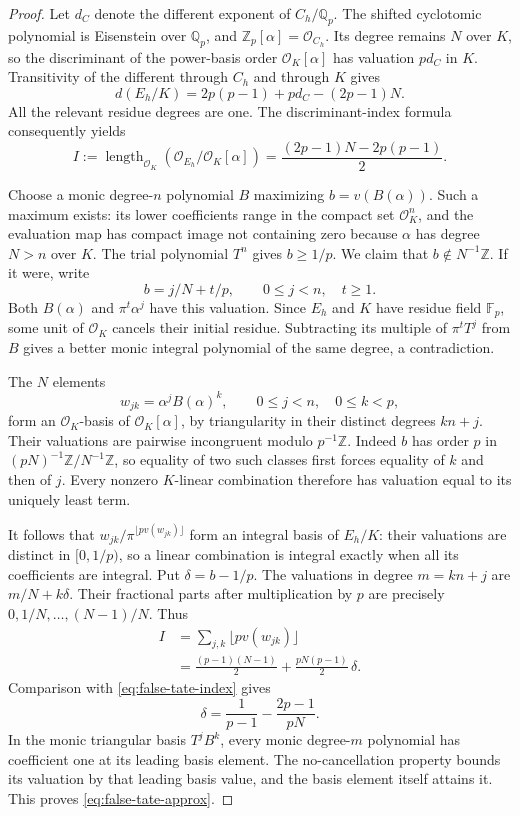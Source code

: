 \begin{proof}
Let $d_C$ denote the different exponent of $C_h/\mathbb Q_p$.
The shifted cyclotomic polynomial is Eisenstein over $\mathbb Q_p$,
and $\mathbb Z_p[\alpha]=\mathcal O_{C_h}$. Its degree remains $N$
over $K$, so the discriminant of the power-basis order
$\mathcal O_K[\alpha]$ has valuation $p d_C$ in $K$.
Transitivity of the different through $C_h$ and through $K$ gives
\[
 d(E_h/K)=2p(p-1)+p d_C-(2p-1)N.
\]
All the relevant residue degrees are one. The discriminant-index
formula consequently yields
\begin{equation}\label{eq:false-tate-index}
 I:=\operatorname{length}_{\mathcal O_K}
     (\mathcal O_{E_h}/\mathcal O_K[\alpha])
 =\frac{(2p-1)N-2p(p-1)}2.
\end{equation}

Choose a monic degree-$n$ polynomial $B$ maximizing
$b=v(B(\alpha))$. Such a maximum exists: its lower coefficients range
in the compact set $\mathcal O_K^n$, and the evaluation map has compact
image not containing zero because $\alpha$ has degree $N>n$ over $K$.
The trial polynomial $T^n$ gives $b\ge1/p$.
We claim that $b\notin N^{-1}\mathbb Z$.
If it were, write
\[
 b=j/N+t/p,\qquad 0\le j<n,\quad t\ge1.
\]
Both $B(\alpha)$ and $\pi^t\alpha^j$ have this valuation. Since
$E_h$ and $K$ have residue field $\mathbb F_p$, some unit of
$\mathcal O_K$ cancels their initial residue. Subtracting its multiple
of $\pi^tT^j$ from $B$ gives a better monic integral polynomial of
the same degree, a contradiction.

The $N$ elements
\[
 w_{jk}=\alpha^jB(\alpha)^k,
 \qquad 0\le j<n,\quad 0\le k<p,
\]
form an $\mathcal O_K$-basis of $\mathcal O_K[\alpha]$, by triangularity
in their distinct degrees $kn+j$. Their valuations are pairwise
incongruent modulo $p^{-1}\mathbb Z$. Indeed $b$ has order $p$ in
$(pN)^{-1}\mathbb Z/N^{-1}\mathbb Z$, so equality of two such classes
first forces equality of $k$ and then of $j$.
Every nonzero $K$-linear combination therefore has valuation equal
to its uniquely least term.

It follows that
$w_{jk}/\pi^{\lfloor p v(w_{jk})\rfloor}$ form an integral basis
of $E_h/K$: their valuations are distinct in $[0,1/p)$, so a linear
combination is integral exactly when all its coefficients are integral.
Put $\delta=b-1/p$. The valuations in degree $m=kn+j$ are
$m/N+k\delta$. Their fractional parts after multiplication by $p$
are precisely $0,1/N,\ldots,(N-1)/N$. Thus
\begin{align*}
 I&=\sum_{j,k}\lfloor p v(w_{jk})\rfloor\\
  &=\frac{(p-1)(N-1)}2+
       \frac{pN(p-1)}2\,\delta.
\end{align*}
Comparison with \eqref{eq:false-tate-index} gives
\[
 \delta=\frac1{p-1}-\frac{2p-1}{pN}.
\]
In the monic triangular basis $T^jB^k$, every monic degree-$m$
polynomial has coefficient one at its leading basis element.
The no-cancellation property bounds its valuation by that leading
basis value, and the basis element itself attains it. This proves
\eqref{eq:false-tate-approx}.


\end{proof}
